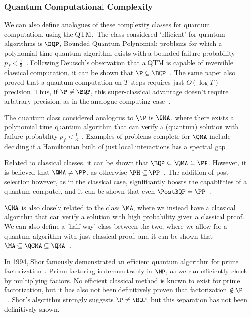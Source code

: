 \subsubsection*{Quantum Computational Complexity}
We can also define analogues of these complexity classes for quantum computation, using the QTM.\ The class considered `efficient' for quantum algorithms is $\BQP$, Bounded Quantum Polynomial; problems for which a polynomial time quantum algorithm exists with a bounded failure probability $p_{f}<\frac{1}{3}$~\cite{Nielsen2000}. Following Deutsch's observation that a QTM is capable of reversible classical computation, it can be shown that $\P\subseteq \BQP$~\cite{Bernstein1997}. The same paper also proved that a quantum computation on $T$ steps requires just $O\left(\log{T}\right)$ precision. Thus, if $\P\neq \BQP$, this super-classical advantage doesn't require arbitrary precision, as in the analogue computing case~\cite{Bernstein1997}.\par
The quantum class considered analogous to $\NP$ is $\QMA$, where there exists a polynomial time quantum algorithm that can verify a (quantum) solution with failure probability $p_{f}<\frac{1}{3}$~\cite{Watrous2008}. Examples of problems complete for $\QMA$ include deciding if a Hamiltonian built of just local interactions has a spectral gap~\cite{Kempe2004}.\par
Related to classical classes, it can be shown that $\BQP\subseteq \QMA\subseteq \PP$. However, it is believed that $\QMA\neq \PP$, as otherwise $\PH\subseteq \PP$~\cite{Vyalyi03}. The addition of post-selection however, as in the classical case, significantly boosts the capabilities of a quantum computer, and it can be shown that even $\PostBQP=\PP$~\cite{Aaronson2004c}.\par
$\QMA$ is also closely related to the class $\MA$, where we instead have a classical algorithm that can verify a solution with high probability given a classical proof. We can also define a `half-way' class between the two, where we allow for a quantum algorithm with just classical proof, and it can be shown that $\MA\subseteq \QCMA\subseteq \QMA$~\cite{Aharonov2002}.\par
In 1994, Shor famously demonstrated an efficient quantum algorithm for prime factorization~\cite{Shor1994}. Prime factoring is demonstrably in $\NP$, as we can efficiently check by multiplying factors. No efficient classical method is known to exist for prime factorization, but it has also not been definitively proven that factorization $\notin \P$~\cite{Nielsen2000}. Shor's algorithm strongly suggests $\P\neq \BQP$, but this separation has not been definitively shown.\par
